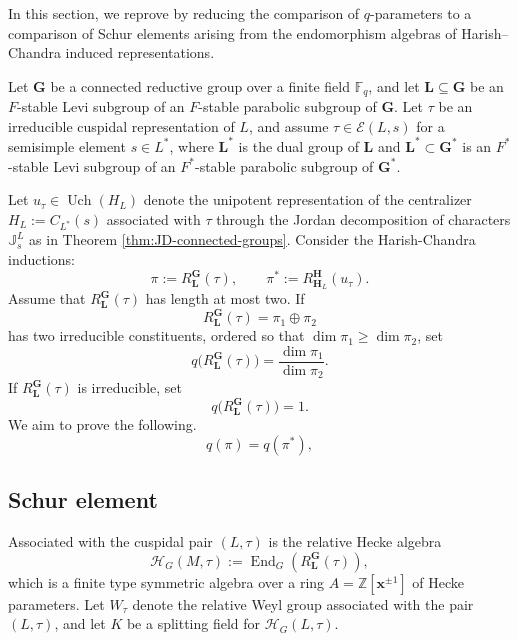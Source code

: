 \documentclass{amsart}
\theoremstyle{plain}
\numberwithin{equation}{section}
\theoremstyle{definition}
\renewcommand{\dim}{\operatorname{dim}}
\newcommand{\cE}{\mathcal{E}}
\newcommand{\End}{\operatorname{End}}
\newcommand{\fq}{\mathbb{F}_{q}}
\newcommand{\Uch}{\operatorname{Uch}}
\newcommand{\J}{\mathbb{J}}
\newcommand{\bG}{\mathbf{G}}
\newcommand{\bL}{\mathbf{L}}
\newcommand{\bH}{\mathbf{H}}
\begin{document}
In this section, we reprove \cite[Proposition 3.2.3]{ohara2025} by reducing the comparison of $q$-parameters to a comparison of Schur elements arising from the endomorphism algebras of Harish--Chandra induced representations.

Let $\bG$ be a connected reductive group over a finite field $\fq$, and let $\bL \subseteq \bG$ be an $F$-stable Levi subgroup of an $F$-stable parabolic subgroup of $\bG$.
Let $\tau$ be an irreducible cuspidal representation of $L$, and assume $\tau \in \cE(L, s)$ for a semisimple element $s \in L^*$, where $\bL^*$ is the dual group of $\bL$ and $\bL^* \subset \bG^*$ is an $F^*$-stable Levi subgroup of an $F^*$-stable parabolic subgroup of $\bG^*$.

Let $u_{\tau} \in \Uch(H_L)$ denote the unipotent representation of the centralizer $H_L := C_{L^*}(s)$ associated with $\tau$ through the Jordan decomposition of  characters $\J_s^L$ as in Theorem \ref{thm:JD-connected-groups}.
Consider the Harish-Chandra inductions:
\[
\pi := R_{\bL}^{\bG}(\tau), \qquad \pi^* := R_{\bH_L}^{\bH}(u_{\tau}).
\]
Assume that \(R_{\bL}^{\bG}(\tau)\) has length at most two.  If
\[
R_{\bL}^{\bG}(\tau)=\pi_1\oplus\pi_2
\]
has two irreducible constituents, ordered so that
\(\dim\pi_1\geq \dim\pi_2\), set
\[
q\bigl(R_{\bL}^{\bG}(\tau)\bigr)
=
\frac{\dim\pi_1}{\dim\pi_2}.
\]
If \(R_{\bL}^{\bG}(\tau)\) is irreducible, set
\[
q\bigl(R_{\bL}^{\bG}(\tau)\bigr)=1.
\]
We aim to prove the following.
\[
q(\pi) = q(\pi^*),
\]
\subsection{Schur element}
Associated with the cuspidal pair $(L, \tau)$ is the relative Hecke algebra
\[
\mathcal{H}_G(M, \tau) := \End_{G}(R_{\bL}^{\bG}(\tau)),
\]
which is a finite type symmetric algebra over a ring $A = \mathbb{Z}[\mathbf{x}^{\pm1}]$ of Hecke parameters.
Let $W_{\tau}$ denote the relative Weyl group associated with the pair $(L,\tau)$,
and let $K$ be a splitting field for $\mathcal{H}_G(L, \tau)$.
\end{document}
